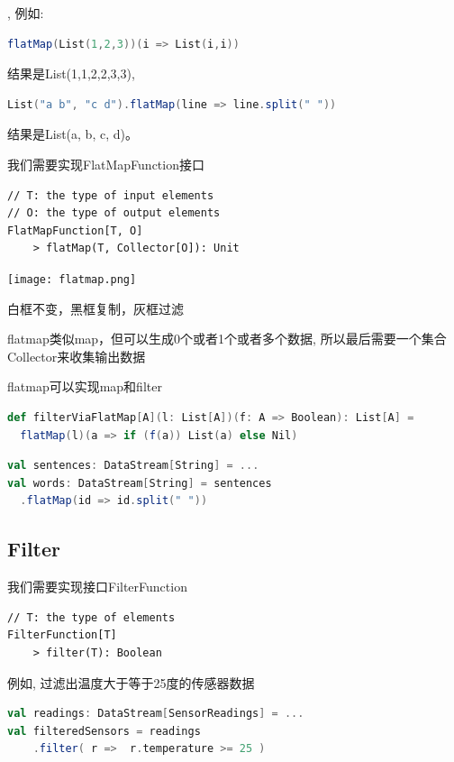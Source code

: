 \documentclass[oneside]{ctexbook}
\begin{document}
, 例如: 

\begin{lstlisting}[language=scala, breaklines]
flatMap(List(1,2,3))(i => List(i,i))
\end{lstlisting}

结果是List(1,1,2,2,3,3), 

\begin{lstlisting}[language=scala, breaklines]
List("a b", "c d").flatMap(line => line.split(" "))
\end{lstlisting}

结果是List(a, b, c, d)。

我们需要实现\colorbox{gray!20}{FlatMapFunction}接口

\begin{lstlisting}
// T: the type of input elements
// O: the type of output elements
FlatMapFunction[T, O]
    > flatMap(T, Collector[O]): Unit
\end{lstlisting}

\noindent \texttt{[image: flatmap.png]}

白框不变，黑框复制，灰框过滤

flatmap类似map，但可以生成0个或者1个或者多个数据, 所以最后需要一个集合Collector来收集输出数据

flatmap可以实现map和filter

\begin{lstlisting}[language=scala, breaklines]
def filterViaFlatMap[A](l: List[A])(f: A => Boolean): List[A] =
  flatMap(l)(a => if (f(a)) List(a) else Nil)
\end{lstlisting}

\begin{lstlisting}[language=scala, breaklines]
val sentences: DataStream[String] = ...
val words: DataStream[String] = sentences
  .flatMap(id => id.split(" "))
\end{lstlisting}

\subsection{Filter}

我们需要实现接口\colorbox{gray!20}{FilterFunction}

\begin{lstlisting}
// T: the type of elements
FilterFunction[T]
    > filter(T): Boolean
\end{lstlisting}

例如, 过滤出温度大于等于25度的传感器数据

\begin{lstlisting}[language=scala, breaklines]
val readings: DataStream[SensorReadings] = ...
val filteredSensors = readings
    .filter( r =>  r.temperature >= 25 )
\end{lstlisting}
\end{document}
